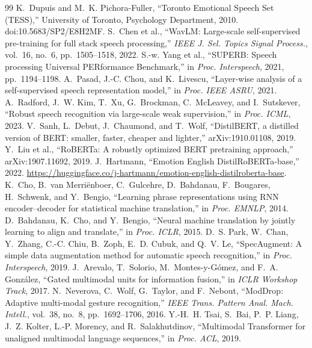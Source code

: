 \begin{thebibliography}{99}\small\setlength\itemsep{0pt}
{} K.~Dupuis and M.~K. Pichora-Fuller, ``Toronto Emotional Speech Set (TESS),'' University of Toronto, Psychology Department, 2010. doi:10.5683/SP2/E8H2MF.
 S.~Chen et al., ``WavLM: Large-scale self-supervised pre-training for full stack speech processing,'' \emph{IEEE J. Sel. Topics Signal Process.}, vol.~16, no.~6, pp.~1505--1518, 2022.
 S.-w. Yang et al., ``SUPERB: Speech processing Universal PERformance Benchmark,'' in \emph{Proc. Interspeech}, 2021, pp.~1194--1198.
 A.~Pasad, J.-C. Chou, and K.~Livescu, ``Layer-wise analysis of a self-supervised speech representation model,'' in \emph{Proc. IEEE ASRU}, 2021.
 A.~Radford, J.~W. Kim, T.~Xu, G.~Brockman, C.~McLeavey, and I.~Sutskever, ``Robust speech recognition via large-scale weak supervision,'' in \emph{Proc. ICML}, 2023.
 V.~Sanh, L.~Debut, J.~Chaumond, and T.~Wolf, ``DistilBERT, a distilled version of BERT: smaller, faster, cheaper and lighter,'' arXiv:1910.01108, 2019.
 Y.~Liu et al., ``RoBERTa: A robustly optimized BERT pretraining approach,'' arXiv:1907.11692, 2019.
 J.~Hartmann, ``Emotion English DistilRoBERTa-base,'' 2022. \url{https://huggingface.co/j-hartmann/emotion-english-distilroberta-base}.
 K.~Cho, B.~van Merri\"enboer, C.~Gulcehre, D.~Bahdanau, F.~Bougares, H.~Schwenk, and Y.~Bengio, ``Learning phrase representations using RNN encoder--decoder for statistical machine translation,'' in \emph{Proc. EMNLP}, 2014.
 D.~Bahdanau, K.~Cho, and Y.~Bengio, ``Neural machine translation by jointly learning to align and translate,'' in \emph{Proc. ICLR}, 2015.
 D.~S. Park, W.~Chan, Y.~Zhang, C.-C. Chiu, B.~Zoph, E.~D. Cubuk, and Q.~V. Le, ``SpecAugment: A simple data augmentation method for automatic speech recognition,'' in \emph{Proc. Interspeech}, 2019.
 J.~Arevalo, T.~Solorio, M.~Montes-y-G\'omez, and F.~A. Gonz\'alez, ``Gated multimodal units for information fusion,'' in \emph{ICLR Workshop Track}, 2017.
 N.~Neverova, C.~Wolf, G.~Taylor, and F.~Nebout, ``ModDrop: Adaptive multi-modal gesture recognition,'' \emph{IEEE Trans. Pattern Anal. Mach. Intell.}, vol.~38, no.~8, pp.~1692--1706, 2016.
 Y.-H.~H. Tsai, S.~Bai, P.~P. Liang, J.~Z. Kolter, L.-P. Morency, and R.~Salakhutdinov, ``Multimodal Transformer for unaligned multimodal language sequences,'' in \emph{Proc. ACL}, 2019.

\end{thebibliography}
